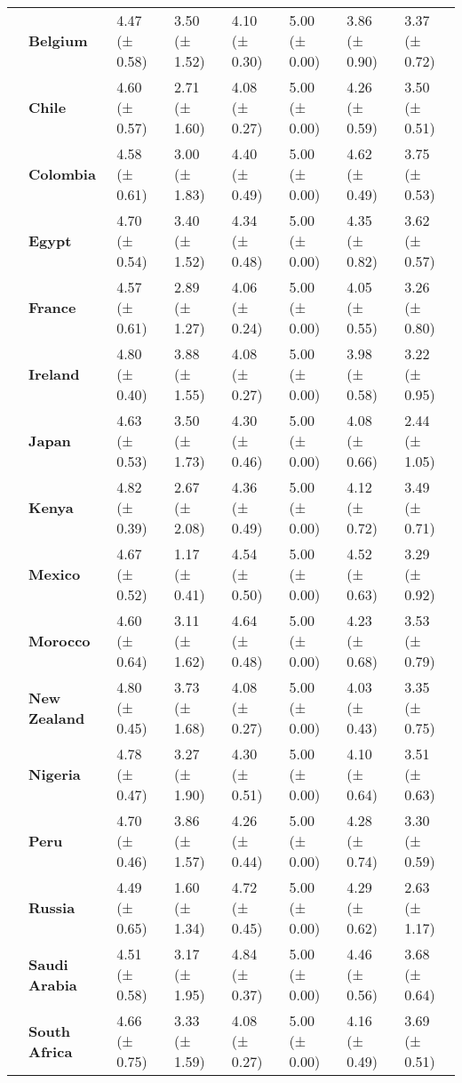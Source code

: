 \begin{tabular}{llllllll}
\textbf{} & \textbf{Belgium} & 4.47 (± 0.58) & 3.50 (± 1.52) & 4.10 (± 0.30) & 5.00 (± 0.00) & 3.86 (± 0.90) & 3.37 (± 0.72) \\
\textbf{} & \textbf{Chile} & 4.60 (± 0.57) & 2.71 (± 1.60) & 4.08 (± 0.27) & 5.00 (± 0.00) & 4.26 (± 0.59) & 3.50 (± 0.51) \\
\textbf{} & \textbf{Colombia} & 4.58 (± 0.61) & 3.00 (± 1.83) & 4.40 (± 0.49) & 5.00 (± 0.00) & 4.62 (± 0.49) & 3.75 (± 0.53) \\
\textbf{} & \textbf{Egypt} & 4.70 (± 0.54) & 3.40 (± 1.52) & 4.34 (± 0.48) & 5.00 (± 0.00) & 4.35 (± 0.82) & 3.62 (± 0.57) \\
\textbf{} & \textbf{France} & 4.57 (± 0.61) & 2.89 (± 1.27) & 4.06 (± 0.24) & 5.00 (± 0.00) & 4.05 (± 0.55) & 3.26 (± 0.80) \\
\textbf{} & \textbf{Ireland} & 4.80 (± 0.40) & 3.88 (± 1.55) & 4.08 (± 0.27) & 5.00 (± 0.00) & 3.98 (± 0.58) & 3.22 (± 0.95) \\
\textbf{} & \textbf{Japan} & 4.63 (± 0.53) & 3.50 (± 1.73) & 4.30 (± 0.46) & 5.00 (± 0.00) & 4.08 (± 0.66) & 2.44 (± 1.05) \\
\textbf{} & \textbf{Kenya} & 4.82 (± 0.39) & 2.67 (± 2.08) & 4.36 (± 0.49) & 5.00 (± 0.00) & 4.12 (± 0.72) & 3.49 (± 0.71) \\
\textbf{} & \textbf{Mexico} & 4.67 (± 0.52) & 1.17 (± 0.41) & 4.54 (± 0.50) & 5.00 (± 0.00) & 4.52 (± 0.63) & 3.29 (± 0.92) \\
\textbf{} & \textbf{Morocco} & 4.60 (± 0.64) & 3.11 (± 1.62) & 4.64 (± 0.48) & 5.00 (± 0.00) & 4.23 (± 0.68) & 3.53 (± 0.79) \\
\textbf{} & \textbf{New Zealand} & 4.80 (± 0.45) & 3.73 (± 1.68) & 4.08 (± 0.27) & 5.00 (± 0.00) & 4.03 (± 0.43) & 3.35 (± 0.75) \\
\textbf{} & \textbf{Nigeria} & 4.78 (± 0.47) & 3.27 (± 1.90) & 4.30 (± 0.51) & 5.00 (± 0.00) & 4.10 (± 0.64) & 3.51 (± 0.63) \\
\textbf{} & \textbf{Peru} & 4.70 (± 0.46) & 3.86 (± 1.57) & 4.26 (± 0.44) & 5.00 (± 0.00) & 4.28 (± 0.74) & 3.30 (± 0.59) \\
\textbf{} & \textbf{Russia} & 4.49 (± 0.65) & 1.60 (± 1.34) & 4.72 (± 0.45) & 5.00 (± 0.00) & 4.29 (± 0.62) & 2.63 (± 1.17) \\
\textbf{} & \textbf{Saudi Arabia} & 4.51 (± 0.58) & 3.17 (± 1.95) & 4.84 (± 0.37) & 5.00 (± 0.00) & 4.46 (± 0.56) & 3.68 (± 0.64) \\
\textbf{} & \textbf{South Africa} & 4.66 (± 0.75) & 3.33 (± 1.59) & 4.08 (± 0.27) & 5.00 (± 0.00) & 4.16 (± 0.49) & 3.69 (± 0.51) \\

\end{tabular}
